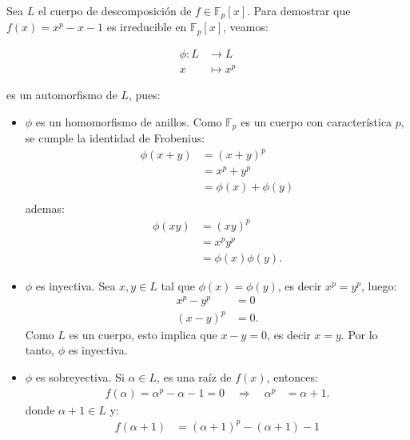\begin{solucion}
Sea $L$ el cuerpo de descomposición de $f \in \mathbb{F}_p[x]$. Para demostrar que $f(x)=x^p - x - 1$ es irreducible en $\mathbb{F}_p[x]$, veamos:

\begin{align*}
    \phi: L &\longrightarrow L\\
    x &\mapsto x^p
\end{align*}

es un automorfismo de $L$, pues:
\begin{itemize}
    \item $\phi$ es un homomorfismo de anillos. Como $\mathbb F_p$ es un cuerpo con característica $p$, se cumple la identidad de Frobenius:
    \begin{align*}
        \phi(x+y) &= (x+y)^p \\
        &= x^p + y^p \\
        &= \phi(x) + \phi(y) \\
    \end{align*}
    ademas:
    \begin{align*}
        \phi(xy) &= (xy)^p \\
        &= x^p y^p \\
        &= \phi(x) \phi(y).
    \end{align*}
    \item $\phi$ es inyectiva. Sea $x,y \in L$ tal que $\phi(x) = \phi(y)$, es decir $x^p = y^p$, luego:
    \begin{align*}
        x^p - y^p &= 0 \\
        (x-y)^p &= 0.
    \end{align*}
    Como $L$ es un cuerpo, esto implica que $x-y=0$, es decir $x=y$. Por lo tanto, $\phi$ es inyectiva.
    \item $\phi$ es sobreyectiva. Si $\alpha \in L$, es una raíz de $f(x)$, entonces:
    \begin{align*}
        f(\alpha) = \alpha^p - \alpha - 1 
        = 0 \quad 
        \Rightarrow \quad \alpha^p &= \alpha + 1.
    \end{align*}
    donde $\alpha + 1 \in L$ y:
    \begin{align*}
        f(\alpha + 1) &= (\alpha + 1)^p - (\alpha + 1) - 1 \\

\end{align*}
\end{itemize}
\end{solucion}
